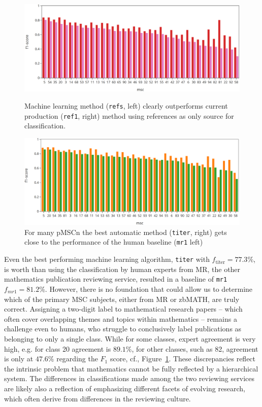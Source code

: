 \begin{figure}[t]
  \centering
  \includegraphics[width=1\textwidth]{ref1-refs.png}
  \caption{Machine learning method (\texttt{refs}, left)  clearly outperforms current production (\texttt{ref1}, right) method using references as only source for classification.}\label{fgRefs}
  \includegraphics[width=1\textwidth]{mr1-titer.png}
  \caption{For many pMSCn the best automatic method (\texttt{titer}, right) gets close to the performance of the human baseline (\texttt{mr1} left)}\label{fgHum}
\end{figure}
Even the best performing machine learning algorithm, \texttt{titer} with \(f_{\mathrm{titer}} = 77.3\%\), is worth than using the classification by human experts from MR, the other mathematics publication reviewing service, resulted in a baseline of \texttt{mr1} \(f_{mr1} = 81.2\%.\)
However, there is no foundation that could allow us to determine which of the primary MSC subjects, either from MR or zbMATH, are truly correct.
Assigning a two-digit label to mathematical research papers -- which often cover overlapping themes and topics within mathematics -- remains a challenge even to humans, who struggle to conclusively label publications as belonging to only a single class.
While for some classes, expert agreement is very high, e.g. for class 20 agreement is \(89.1\%\), for other classes, such as 82, agreement is only at \(47.6\%\) regarding the \(F_{1}\) score, cf., Figure~\ref{fgHum}.
These discrepancies reflect the intrinsic problem that mathematics cannot be fully reflected by a hierarchical system.
The differences in classifications made among the two reviewing services are likely also a reflection of emphasizing different facets of evolving research, which often derive from differences in the reviewing culture.


